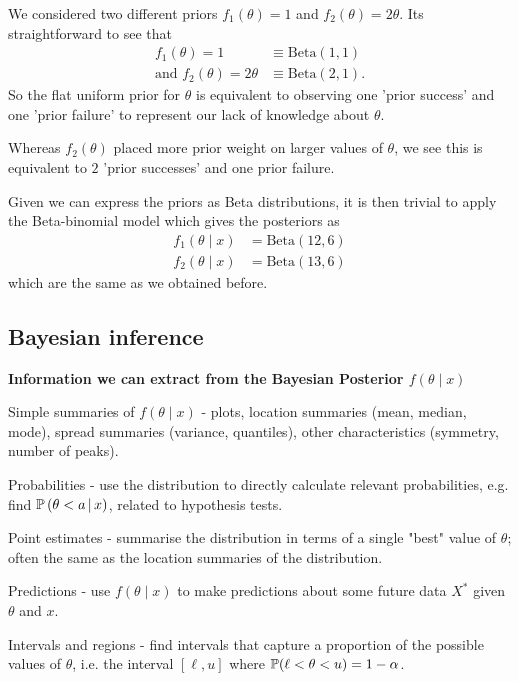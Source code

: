 \documentclass[10pt, a4paper]{article}
\begin{document}
\begin{example}
    We considered two different priors $f_1(\theta) = 1$ and $f_2(\theta) = 2\theta$.
    Its straightforward to see that
    \begin{align*}
        f_1(\theta) = 1 &\equiv \mathrm{Beta}(1, 1) \\
        \text{and } f_2(\theta) = 2\theta &\equiv \mathrm{Beta}(2, 1).
    \end{align*}
    So the flat uniform prior for $\theta$ is equivalent to observing one 'prior success' and one 'prior failure' to represent our lack of knowledge about $\theta$.

    Whereas $f_2(\theta)$ placed more prior weight on larger values of $\theta$,
    we see this is equivalent to $2$ 'prior successes' and one prior failure.

    Given we can express the priors as Beta distributions,
    it is then trivial to apply the Beta-binomial model which gives the posteriors as
    \begin{align*}
        f_1(\theta\mid x) &= \mathrm{Beta}(12, 6) \\
        f_2(\theta\mid x) &= \mathrm{Beta}(13, 6)
    \end{align*}
    which are the same as we obtained before.
\end{example}

\subsection{Bayesian inference}

\textbf{Information we can extract from the Bayesian Posterior $f(\theta\mid x)$}

Simple summaries of $f(\theta\mid x)$ - plots,
location summaries
(mean,
median,
mode),
spread summaries
(variance,
quantiles),
other characteristics
(symmetry,
number of peaks).

Probabilities -
use the distribution to directly calculate relevant probabilities,
e.g. find $\cP{\theta < a}{x}$,
related to hypothesis tests.

Point estimates -
summarise the distribution in terms of a single "best" value of $\theta$;
often the same as the location summaries of the distribution.

Predictions -
use $f(\theta\mid x)$ to make predictions about some future data $X ^ {*}$ given $\theta$ and $x$.

Intervals and regions -
find intervals that capture a proportion of the possible values of $\theta$,
i.e. the interval $[\ell, u]$ where $\P(\ell < \theta < u) = 1 - \alpha$.
\end{document}
